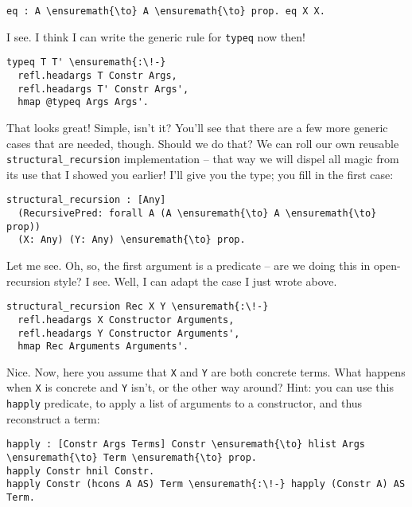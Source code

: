 \begin{verbatim}
eq : A \ensuremath{\to} A \ensuremath{\to} prop. eq X X.
\end{verbatim}

\heroSTUDENT{} I see. I think I can write the generic rule for \texttt{typeq}
now then!

\begin{verbatim}
typeq T T' \ensuremath{:\!-}
  refl.headargs T Constr Args,
  refl.headargs T' Constr Args',
  hmap @typeq Args Args'.
\end{verbatim}

\heroADVISOR{} That looks great! Simple, isn't it? You'll see that there are a
few more generic cases that are needed, though. Should we do that? We
can roll our own reusable \texttt{structural\_recursion} implementation
-- that way we will dispel all magic from its use that I showed you
earlier! I'll give you the type; you fill in the first case:

\importantCodeblock{}

\begin{verbatim}
structural_recursion : [Any] 
  (RecursivePred: forall A (A \ensuremath{\to} A \ensuremath{\to} prop))
  (X: Any) (Y: Any) \ensuremath{\to} prop.
\end{verbatim}

\importantCodeblockEnd{}

\heroSTUDENT{} Let me see. Oh, so, the first argument is a predicate -- are we
doing this in open-recursion style? I see. Well, I can adapt the case I
just wrote above.

\begin{verbatim}
structural_recursion Rec X Y \ensuremath{:\!-}
  refl.headargs X Constructor Arguments,
  refl.headargs Y Constructor Arguments',
  hmap Rec Arguments Arguments'.
\end{verbatim}

\heroADVISOR{} Nice. Now, here you assume that \texttt{X} and \texttt{Y} are
both concrete terms. What happens when \texttt{X} is concrete and
\texttt{Y} isn't, or the other way around? Hint: you can use this
\texttt{happly} predicate, to apply a list of arguments to a
constructor, and thus reconstruct a term:

\begin{verbatim}
happly : [Constr Args Terms] Constr \ensuremath{\to} hlist Args \ensuremath{\to} Term \ensuremath{\to} prop.
happly Constr hnil Constr.
happly Constr (hcons A AS) Term \ensuremath{:\!-} happly (Constr A) AS Term.
\end{verbatim}

